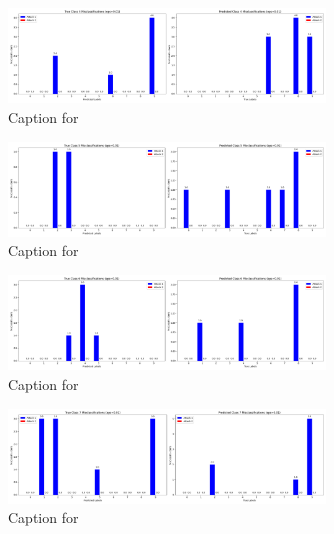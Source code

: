 \documentclass{article}
\begin{document}
\begin{figure}[!htbp]
\centering
\includegraphics[width=0.75\textwidth]{combined_class_boundary_pgd/combined_class_4_misclassifications_eps_0.01.png}
\caption{Caption for }
\label{fig:combined_class_4_misclassifications_eps_0.01.png}
\end{figure}

\begin{figure}[!htbp]
\centering
\includegraphics[width=0.75\textwidth]{combined_class_boundary_pgd/combined_class_5_misclassifications_eps_0.01.png}
\caption{Caption for }
\label{fig:combined_class_5_misclassifications_eps_0.01.png}
\end{figure}

\begin{figure}[!htbp]
\centering
\includegraphics[width=0.75\textwidth]{combined_class_boundary_pgd/combined_class_6_misclassifications_eps_0.01.png}
\caption{Caption for }
\label{fig:combined_class_6_misclassifications_eps_0.01.png}
\end{figure}

\begin{figure}[!htbp]
\centering
\includegraphics[width=0.75\textwidth]{combined_class_boundary_pgd/combined_class_7_misclassifications_eps_0.01.png}
\caption{Caption for }
\label{fig:combined_class_7_misclassifications_eps_0.01.png}
\end{figure}
\end{document}
